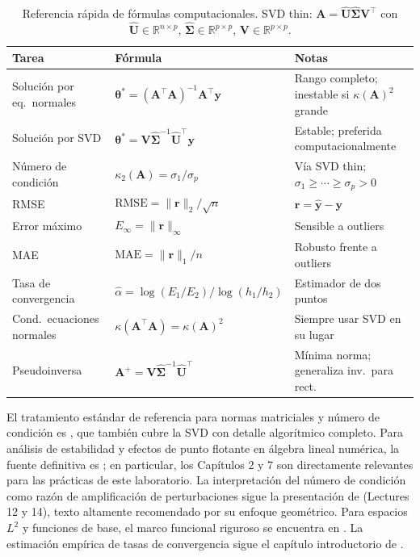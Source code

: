 \begin{table}[htbp]
\centering
\caption{Referencia rápida de fórmulas computacionales. SVD thin:
  $\mathbf{A} = \hat{\mathbf{U}}\hat{\boldsymbol{\Sigma}}\mathbf{V}^\top$
  con $\hat{\mathbf{U}} \in \mathbb{R}^{n\times p}$,
  $\hat{\boldsymbol{\Sigma}} \in \mathbb{R}^{p\times p}$,
  $\mathbf{V} \in \mathbb{R}^{p\times p}$.}
\label{tab:referencia_rapida}
\small
\begin{tabular}{lll}
  \toprule
  \textbf{Tarea} & \textbf{Fórmula} & \textbf{Notas} \\
  \midrule
  Solución por eq.\ normales
    & $\boldsymbol{\theta}^* = (\mathbf{A}^\top\mathbf{A})^{-1}\mathbf{A}^\top\mathbf{y}$
    & Rango completo; inestable si $\kappa(\mathbf{A})^2$ grande \\[3pt]
  Solución por SVD
    & $\boldsymbol{\theta}^* = \mathbf{V}\hat{\boldsymbol{\Sigma}}^{-1}\hat{\mathbf{U}}^\top\mathbf{y}$
    & Estable; preferida computacionalmente \\[3pt]
  Número de condición
    & $\kappa_2(\mathbf{A}) = \sigma_1 / \sigma_p$
    & Vía SVD thin; $\sigma_1 \geq \cdots \geq \sigma_p > 0$ \\[3pt]
  RMSE
    & $\mathrm{RMSE} = \|\mathbf{r}\|_2 / \sqrt{n}$
    & $\mathbf{r} = \hat{\mathbf{y}} - \mathbf{y}$ \\[3pt]
  Error máximo
    & $E_\infty = \|\mathbf{r}\|_\infty$
    & Sensible a outliers \\[3pt]
  MAE
    & $\mathrm{MAE} = \|\mathbf{r}\|_1 / n$
    & Robusto frente a outliers \\[3pt]
  Tasa de convergencia
    & $\hat{\alpha} = \log(E_1/E_2)/\log(h_1/h_2)$
    & Estimador de dos puntos \\[3pt]
  Cond.\ ecuaciones normales
    & $\kappa(\mathbf{A}^\top\mathbf{A}) = \kappa(\mathbf{A})^2$
    & Siempre usar SVD en su lugar \\[3pt]
  Pseudoinversa
    & $\mathbf{A}^+ = \mathbf{V}\hat{\boldsymbol{\Sigma}}^{-1}\hat{\mathbf{U}}^\top$
    & Mínima norma; generaliza inv.\ para rect. \\
  \bottomrule
\end{tabular}
\end{table}

\FloatBarrier

\begin{notasbib}
El tratamiento estándar de referencia para normas matriciales y número de
condición es \textcite{golub2013matrix}, que también cubre la SVD con
detalle algorítmico completo. Para análisis de estabilidad y efectos de
punto flotante en álgebra lineal numérica, la fuente definitiva es
\textcite{higham2002accuracy}; en particular, los Capítulos 2 y 7 son
directamente relevantes para las prácticas de este laboratorio. La
interpretación del número de condición como razón de amplificación de
perturbaciones sigue la presentación de \textcite{trefethen1997numerical}
(Lectures 12 y 14), texto altamente recomendado por su enfoque geométrico.
Para espacios $L^2$ y funciones de base, el marco funcional riguroso se
encuentra en \textcite{reed1980functional}. La estimación empírica de tasas
de convergencia sigue el capítulo introductorio de \textcite{leveque2007finite}.
\end{notasbib}

\printbibliography[heading=subbibliography,title={Referencias del Apéndice A}]